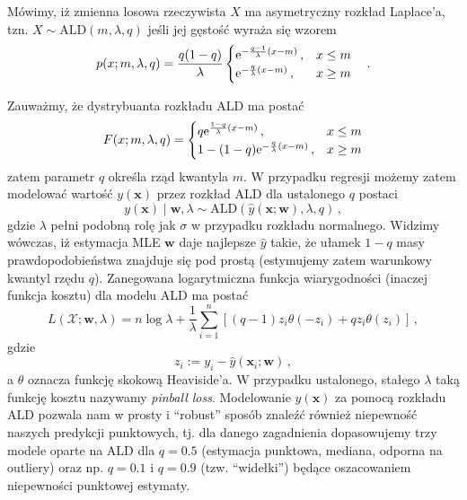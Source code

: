 \documentclass{myclass}
\numberwithin{equation}{subsection}
\begin{document}
\begin{definition}
Mówimy, iż zmienna losowa rzeczywista \(X\) ma asymetryczny rozkład Laplace'a, tzn. \(X \sim
\mathrm{ALD}(m, \lambda, q)\) jeśli jej gęstość wyraża się wzorem
\begin{equation*}
    p(x; m,\lambda,q) = \frac{q(1-q)}{\lambda}\begin{cases}
        \mathrm{e}^{-\frac{q-1}{\lambda} (x - m)}\,,&x \leq m\\
        \mathrm{e}^{-\frac{q}{\lambda} (x - m)}\,,&x \geq m
    \end{cases}\quad.
\end{equation*}
\end{definition}
Zauważmy, że dystrybuanta rozkładu ALD ma postać
\begin{equation}
    F(x; m,\lambda,q) = \begin{cases}
        q \mathrm{e}^{\frac{1-q}{\lambda}(x - m)}\,,&x \leq m\\
        1 - (1-q)\mathrm{e}^{-\frac{q}{\lambda}(x - m)}\,,&x \geq m
    \end{cases}
\end{equation}
zatem parametr \(q\) określa rząd kwantyla \(m\). W przypadku regresji możemy zatem modelować
wartość \(y(\bm{x})\) przez rozkład ALD dla ustalonego \(q\) postaci
\begin{equation}
    y(\bm{x}) \mid \bm{w}, \lambda \sim \mathrm{ALD}(\hat{y}(\bm{x}; \bm{w}), \lambda, q)\,,
\end{equation}
gdzie \(\lambda\) pełni podobną rolę jak \(\sigma\) w przypadku rozkładu normalnego. Widzimy
wówczas, iż estymacja MLE \(\bm{w}\) daje najlepsze \(\hat{y}\) takie, że ułamek \(1-q\) masy
prawdopodobieństwa znajduje się pod prostą (estymujemy zatem warunkowy kwantyl rzędu \(q\)).
Zanegowana logarytmiczna funkcja wiarygodności (inaczej funkcja kosztu) dla modelu ALD ma postać
\begin{equation}\boxed{
    L(\mathcal{X}; \bm{w}, \lambda) = n \log \lambda + \frac{1}{\lambda}\sum_{i=1}^n \left[(q-1)z_i\theta(-z_i) + qz_i\theta(z_i)\right]\,,
}\end{equation}
gdzie
\begin{equation}
    z_i := y_i - \hat{y}(\bm{x}_i;\bm{w})\,,
\end{equation}
a \(\theta\) oznacza funkcję skokową Heaviside'a. W przypadku ustalonego, stałego \(\lambda\) taką
funkcję kosztu nazywamy \emph{pinball loss}. Modelowanie \(y(\bm{x})\) za pomocą rozkładu ALD
pozwala nam w prosty i \enquote{robust} sposób znaleźć również niepewność naszych predykcji
punktowych, tj. dla danego zagadnienia dopasowujemy trzy modele oparte na ALD dla \(q = 0.5\)
(estymacja punktowa, mediana, odporna na outliery) oraz np. \(q = 0.1\) i \(q = 0.9\) (tzw.
\enquote{widełki}) będące oszacowaniem niepewności punktowej estymaty. 
\end{document}
